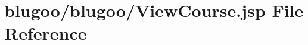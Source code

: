 \hypertarget{ViewCourse_8jsp}{
\section{blugoo/blugoo/ViewCourse.jsp File Reference}
\label{ViewCourse_8jsp}
}



